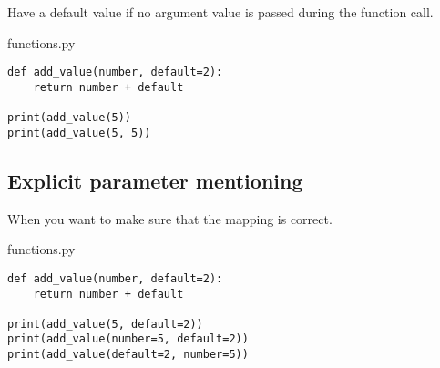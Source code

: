 \documentclass[aspectratio=1610,slidestop]{beamer}
\begin{document}
\begin{pframe}
 Have a default value if no argument value is passed during the function call.
 \medskip

 \begin{minipage}[t]{0.47\textwidth}
  \begin{pythonfile}{functions.py}
   \begin{verbatim}
def add_value(number, default=2):
    return number + default

print(add_value(5))
print(add_value(5, 5))
   \end{verbatim}
  \end{pythonfile}
 \end{minipage}\qquad
 \begin{minipage}[t]{0.47\textwidth}
  \vspace{-3.05cm}
  \begin{terminal}
  \end{terminal}
 \end{minipage}
\end{pframe}


\subsection{Explicit parameter mentioning}
\begin{pframe}
 When you want to make sure that the mapping is correct.
 \medskip

 \begin{minipage}[t]{0.51\textwidth}
  \begin{pythonfile}{functions.py}
   \begin{verbatim}
def add_value(number, default=2):
    return number + default

print(add_value(5, default=2))
print(add_value(number=5, default=2))
print(add_value(default=2, number=5))
   \end{verbatim}
  \end{pythonfile}
 \end{minipage}\qquad
 \begin{minipage}[t]{0.43\textwidth}
  \vspace{-3.45cm}
  \begin{terminal}
  \end{terminal}
 \end{minipage}
\end{pframe}
\end{document}
